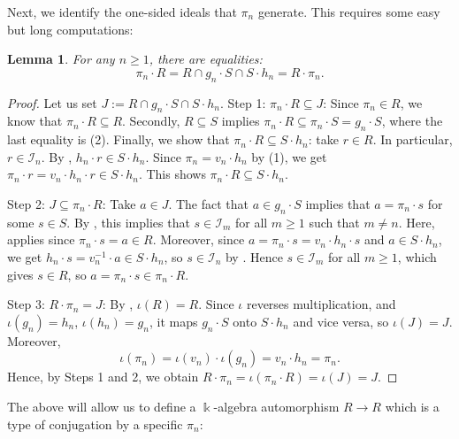 \documentclass{amsart}
\newtheorem{lem}[equation]{Lemma}
\theoremstyle{definition}
\renewcommand{\k}{\Bbbk}
\numberwithin{equation}{section}
\begin{document}
Next, we identify the one-sided ideals that $\pi_n$ generate.
This requires some easy but long computations:

\begin{lem}\label{lem:pi-left-right-ideals}
For any $n \ge 1$, 
there are equalities:
\[
\pi_n \cdot R = R \cap g_n \cdot S \cap S\cdot h_n = R\cdot \pi_n.
\]
\end{lem}
\begin{proof}
Let us set $J:= R \cap g_n \cdot S \cap S\cdot h_n$.
Step 1: $\pi_n\cdot R \subseteq J$:
Since $\pi_n \in R$, we know that $\pi_n\cdot R \subseteq R$.
Secondly, $R \subseteq S$ implies $\pi_n\cdot R \subseteq \pi_n \cdot S = g_n \cdot S$,
where the last equality is (2).
Finally, we show that $\pi_n \cdot R \subseteq S\cdot h_n$:
take $r \in R$. In particular, $r \in \mathcal{I}_n$.
By , $h_n\cdot r \in S\cdot h_n$. Since $\pi_n = v_n\cdot h_n$ by (1), we get $\pi_n\cdot r = v_n\cdot h_n\cdot r \in S\cdot h_n$.
This shows $\pi_n \cdot R \subseteq S\cdot h_n$.

Step 2: $J \subseteq \pi_n \cdot R$: Take $a \in J$.
The fact that $a \in g_n\cdot S$ implies that $a=\pi_n \cdot s$ for some $s \in S$. By ,
this implies that $s \in \mathcal{I}_m$ for all $m \ge 1$ such that $m \ne n$.
Here,  applies since $\pi_n\cdot s = a \in R$. Moreover, since $a = \pi_n\cdot s = v_n\cdot h_n\cdot s$ and $a \in S\cdot h_n$, we get $h_n\cdot s = v_n^{-1}\cdot a \in S\cdot h_n$, so $s \in \mathcal{I}_n$ by . Hence $s \in \mathcal{I}_m$ for all $m \ge 1$, which gives $s \in R$, so $a = \pi_n\cdot s \in \pi_n\cdot R$.

Step 3: $R\cdot\pi_n = J$: By , $\iota(R) = R$. Since $\iota$ reverses multiplication, and $\iota(g_n) = h_n$, $\iota(h_n) = g_n$, it maps $g_n\cdot S$ onto $S\cdot h_n$ and vice versa, so $\iota(J) = J$. Moreover,
\[
\iota(\pi_n) = \iota(v_n)\cdot\iota(g_n) = v_n\cdot h_n = \pi_n.
\]
Hence, by Steps 1 and 2, we obtain
$R\cdot\pi_n = \iota(\pi_n\cdot R) = \iota(J) = J$.
\end{proof}

The above will allow us to define a $\k$-algebra automorphism $R\to R$ which is a type of conjugation by a specific $\pi_n$:
\end{document}
